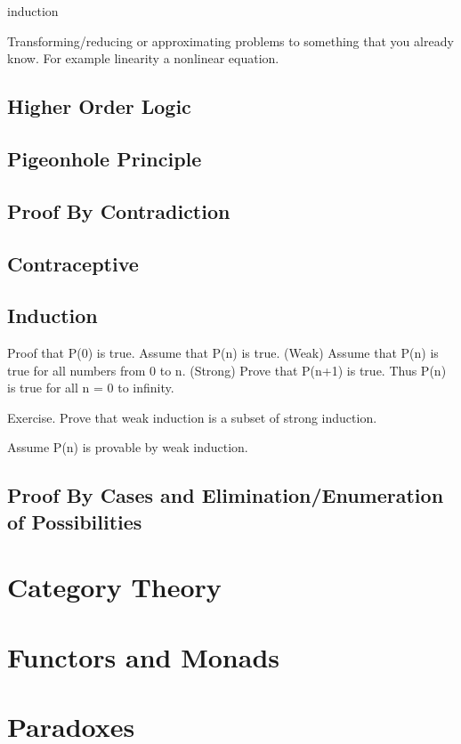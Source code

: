 \documentclass{book}
\begin{document}
induction

Transforming/reducing or approximating problems to something that you already know. 
For example linearity a nonlinear equation.



\section{Higher Order Logic}






\section{Pigeonhole Principle}
\section{Proof By Contradiction}
\section{Contraceptive}
\section{Induction}
Proof that P(0) is true.
Assume that P(n) is true. (Weak)
Assume that P(n) is true for all numbers from 0 to n. (Strong)
Prove that P(n+1) is true. 
Thus P(n) is true for all n = 0 to infinity. 

Exercise. Prove that weak induction is a subset of strong induction.

Assume P(n) is provable by weak induction. 


\section{Proof By Cases and Elimination/Enumeration of Possibilities}

\chapter{Category Theory}
\chapter{Functors and Monads}

\chapter{Paradoxes}
\end{document}
